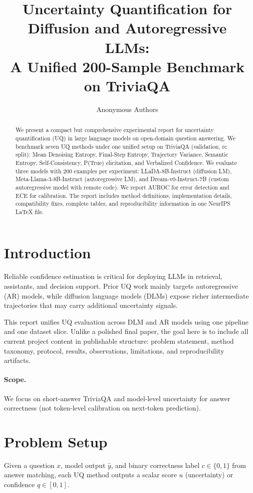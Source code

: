 \documentclass{article}
\title{Uncertainty Quantification for Diffusion and Autoregressive LLMs:\\
A Unified 200-Sample Benchmark on TriviaQA}
\author{Anonymous Authors}
\begin{document}
\maketitle

\begin{abstract}
We present a compact but comprehensive experimental report for uncertainty quantification (UQ) in large language models on open-domain question answering. We benchmark seven UQ methods under one unified setup on TriviaQA (validation, rc split): Mean Denoising Entropy, Final-Step Entropy, Trajectory Variance, Semantic Entropy, Self-Consistency, P(True) elicitation, and Verbalized Confidence. We evaluate three models with 200 examples per experiment: LLaDA-8B-Instruct (diffusion LM), Meta-Llama-3-8B-Instruct (autoregressive LM), and Dream-v0-Instruct-7B (custom autoregressive model with remote code). We report AUROC for error detection and ECE for calibration. The report includes method definitions, implementation details, compatibility fixes, complete tables, and reproducibility information in one NeurIPS \LaTeX{} file.
\end{abstract}

\section{Introduction}
Reliable confidence estimation is critical for deploying LLMs in retrieval, assistants, and decision support. Prior UQ work mainly targets autoregressive (AR) models, while diffusion language models (DLMs) expose richer intermediate trajectories that may carry additional uncertainty signals.

This report unifies UQ evaluation across DLM and AR models using one pipeline and one dataset slice. Unlike a polished final paper, the goal here is to include all current project content in publishable structure: problem statement, method taxonomy, protocol, results, observations, limitations, and reproducibility artifacts.

\paragraph{Scope.}
We focus on short-answer TriviaQA and model-level uncertainty for answer correctness (not token-level calibration on next-token prediction).

\section{Problem Setup}
Given a question $x$, model output $\hat{y}$, and binary correctness label $c \in \{0,1\}$ from answer matching, each UQ method outputs a scalar score $u$ (uncertainty) or confidence $q \in [0,1]$.
\end{document}
